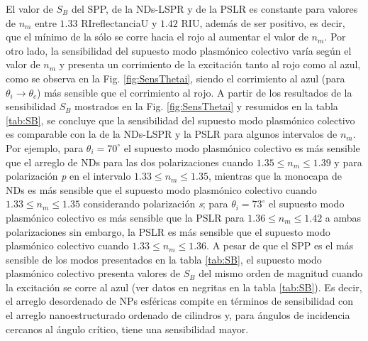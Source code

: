 El valor de $S_B$ del SPP, de la NDs-LSPR y de la PSLR es constante para valores de $n_m$ entre $1.33$ RIreflectanciaU y $1.42$ RIU, además de ser positivo, es decir, que el mínimo de la  sólo se corre hacia el rojo al aumentar el valor de $n_m$. Por otro lado, la sensibilidad del supuesto modo  plasmónico colectivo varía según el valor de $n_m$ y presenta un corrimiento de la excitación tanto al rojo como al azul, como se observa en la Fig. \ref{fig:SensThetai}, siendo el corrimiento al azul (para $\theta_i\to\theta_c$) más sensible que el corrimiento al rojo. A partir de los resultados de la sensibilidad $S_B$ mostrados en la Fig. \ref{fig:SensThetai} y resumidos en la tabla \ref{tab:SB}, se concluye que  la sensibilidad del supuesto modo  plasmónico colectivo es comparable con la de la NDs-LSPR y la PSLR para algunos intervalos de $n_m$. Por ejemplo, para $\theta_i = 70^\circ$ el supuesto modo  plasmónico colectivo es más sensible que el arreglo de NDs para las dos polarizaciones cuando $1.35 \leq n_m \leq 1.39$ y para polarización \emph{p} en el intervalo $1.33\leq n_m \leq 1.35$, mientras que la monocapa de NDs es más sensible que el supuesto modo  plasmónico colectivo cuando $1.33\leq n_m \leq 1.35$ considerando polarización \emph{s}; para $\theta_i=73^\circ$ el supuesto modo  plasmónico colectivo es más sensible que la PSLR para $1.36\leq n_m \leq 1.42$  a ambas polarizaciones sin embargo, la PSLR es más sensible que el supuesto modo  plasmónico colectivo cuando $1.33\leq n_m \leq 1.36$.  A pesar de que el SPP es el más sensible de los modos presentados en la tabla \ref{tab:SB}, el supuesto modo plasmónico colectivo presenta valores de $S_B$ del mismo orden de magnitud cuando la excitación se corre al azul (ver datos en negritas en la tabla \ref{tab:SB}). Es decir, el arreglo desordenado de NPs esféricas compite en términos de sensibilidad con el arreglo nanoestructurado ordenado de cilindros y, para ángulos de incidencia cercanos al ángulo crítico, tiene una sensibilidad mayor.

